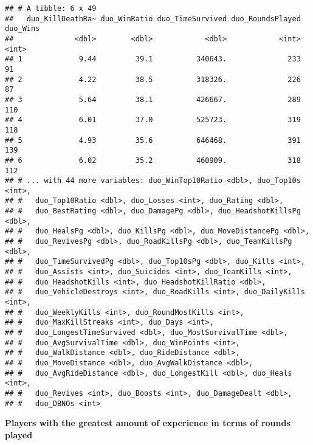 \documentclass[]{article}
\begin{document}
\begin{verbatim}
## # A tibble: 6 x 49
##   duo_KillDeathRa~ duo_WinRatio duo_TimeSurvived duo_RoundsPlayed duo_Wins
##              <dbl>        <dbl>            <dbl>            <int>    <int>
## 1             9.44         39.1          340643.              233       91
## 2             4.22         38.5          318326.              226       87
## 3             5.64         38.1          426667.              289      110
## 4             6.01         37.0          525723.              319      118
## 5             4.93         35.6          646468.              391      139
## 6             6.02         35.2          460909.              318      112
## # ... with 44 more variables: duo_WinTop10Ratio <dbl>, duo_Top10s <int>,
## #   duo_Top10Ratio <dbl>, duo_Losses <int>, duo_Rating <dbl>,
## #   duo_BestRating <dbl>, duo_DamagePg <dbl>, duo_HeadshotKillsPg <dbl>,
## #   duo_HealsPg <dbl>, duo_KillsPg <dbl>, duo_MoveDistancePg <dbl>,
## #   duo_RevivesPg <dbl>, duo_RoadKillsPg <dbl>, duo_TeamKillsPg <dbl>,
## #   duo_TimeSurvivedPg <dbl>, duo_Top10sPg <dbl>, duo_Kills <int>,
## #   duo_Assists <int>, duo_Suicides <int>, duo_TeamKills <int>,
## #   duo_HeadshotKills <int>, duo_HeadshotKillRatio <dbl>,
## #   duo_VehicleDestroys <int>, duo_RoadKills <int>, duo_DailyKills <int>,
## #   duo_WeeklyKills <int>, duo_RoundMostKills <int>,
## #   duo_MaxKillStreaks <int>, duo_Days <int>,
## #   duo_LongestTimeSurvived <dbl>, duo_MostSurvivalTime <dbl>,
## #   duo_AvgSurvivalTime <dbl>, duo_WinPoints <int>,
## #   duo_WalkDistance <dbl>, duo_RideDistance <dbl>,
## #   duo_MoveDistance <dbl>, duo_AvgWalkDistance <dbl>,
## #   duo_AvgRideDistance <dbl>, duo_LongestKill <dbl>, duo_Heals <int>,
## #   duo_Revives <int>, duo_Boosts <int>, duo_DamageDealt <dbl>,
## #   duo_DBNOs <int>
\end{verbatim}

\textbf{Players with the greatest amount of experience in terms of
rounds played}
\end{document}
